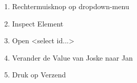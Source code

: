 \begin{enumerate}
  \item Rechtermuisknop op dropdown-menu
  \item Inspect Element
  \item Open \textless select id...\textgreater
  \item Verander de Value van Joske naar Jan
  \item Druk op Verzend
\end{enumerate}